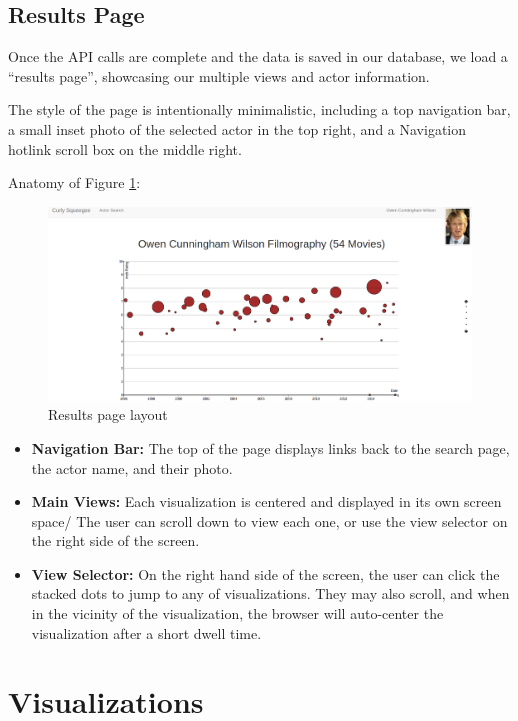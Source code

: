 \documentclass[12pt]{article}
\begin{document}
\subsection{Results Page}

Once the API calls are complete and the data is saved in our database, we load a ``results page'',   showcasing our multiple views and actor information. 

The style of the page is intentionally minimalistic, including a top navigation bar, a small inset photo of the selected actor in the top right, and a Navigation hotlink scroll box on the middle right.

Anatomy of Figure \ref{fig:resultsPage}:


\begin{figure}
	\centering
	\includegraphics[width = \textwidth]{images/resultsPage.png}
	\caption{Results page layout}\label{fig:resultsPage}
\end{figure}


\begin{itemize}
	\item \textbf{Navigation Bar:}  The top of the page displays links back to the search page, the actor name, and their photo.
	\item \textbf{Main Views:} Each visualization is centered and displayed in its own screen space/ The user can scroll down to view each one, or use the view selector on the right side of the screen. 
	\item \textbf{View Selector:} On the right hand side of the screen, the user can click the stacked dots to jump to any of visualizations.  They may also scroll, and when in the vicinity of the visualization, the browser will auto-center the visualization after a short dwell time.
\end{itemize}

\newpage 

\section{Visualizations}
\end{document}
